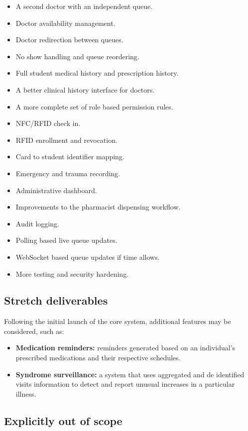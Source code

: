 \documentclass[11pt,a4paper]{article}
\begin{document}
\begin{itemize}
    \item A second doctor with an independent queue.
    \item Doctor availability management.
    \item Doctor redirection between queues.
    \item No show handling and queue reordering.
    \item Full student medical history and prescription history.
    \item A better clinical history interface for doctors.
    \item A more complete set of role based permission rules.
    \item NFC/RFID check in.
    \item RFID enrollment and revocation.
    \item Card to student identifier mapping.
    \item Emergency and trauma recording.
    \item Administrative dashboard.
    \item Improvements to the pharmacist dispensing workflow.
    \item Audit logging.
    \item Polling based live queue updates.
    \item WebSocket based queue updates if time allows.
    \item More testing and security hardening.
\end{itemize}

\subsection{Stretch deliverables}

Following the initial launch of the core system, additional features may be considered, such as:

\begin{itemize}
    \item \textbf{Medication reminders:} reminders generated based on an individual's prescribed medications and their respective schedules.
    \item \textbf{Syndrome surveillance:} a system that uses aggregated and de identified visits information to detect and report unusual increases in a particular illness.
\end{itemize}

\subsection{Explicitly out of scope}
\end{document}
